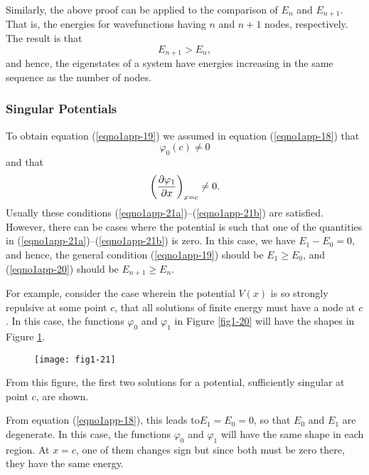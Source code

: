 Similarly, the above proof can be applied to the comparison of $E_n$ 
and $E_{n+1}$.   That is, the energies for wavefunctions having $n$ and 
$n + 1$ nodes, respectively. The result is that
\begin{equation}
E_{n+1} > E_n ,
\label{eqno1app-20}
\end{equation}
and hence, the eigenstates of a system have energies increasing in the 
same sequence as the number of nodes.

\subsubsection{Singular Potentials}

To obtain equation (\ref{eqno1app-19}) we assumed in equation
(\ref{eqno1app-18}) that
\begin{equation}
\varphi_0 (c) \not= 0
\label{eqno1app-21a}
\end{equation}
and that
\begin{equation}
\left( {\partial \varphi_1 \over \partial x} \right)_{x=c} \not= 0 
.
\label{eqno1app-21b}
\end{equation}
Usually these conditions (\ref{eqno1app-21a})--(\ref{eqno1app-21b})
are satisfied. However, there can be cases where the potential is such
that one of the quantities in
(\ref{eqno1app-21a})--(\ref{eqno1app-21b}) is zero. In this case, we
have $E_1 - E_0 = 0$, and hence, the general condition
(\ref{eqno1app-19}) should be $E_1 \geq E_0$, and (\ref{eqno1app-20})
should be $E_{n+1} \geq E_n$.

For example, consider the case wherein the potential $V(x)$ is so
strongly repulsive at some point $c$, that all solutions of finite
energy must have a node at $c$. In this case, the functions
$\varphi_0$ and $\varphi_1$ in Figure \ref{fig1-20} will have the
shapes in Figure \ref{fig1-21}.
\begin{figure}
\texttt{[image: fig1-21]}
\caption{}
\label{fig1-21}
\end{figure}

\noindent
From this figure, the first two solutions for a potential, sufficiently 
singular at point $c$, are shown.
    
From equation (\ref{eqno1app-18}), this leads to$ E_1 = E_0 = 0$, so
that $E_0$ and $E_1$ are degenerate. In this case, the functions
$\varphi_0$ and $\varphi_1$ will have the same shape in each region.
At $x = c$, one of them changes sign but since both must be zero
there, they have the same energy.
    
